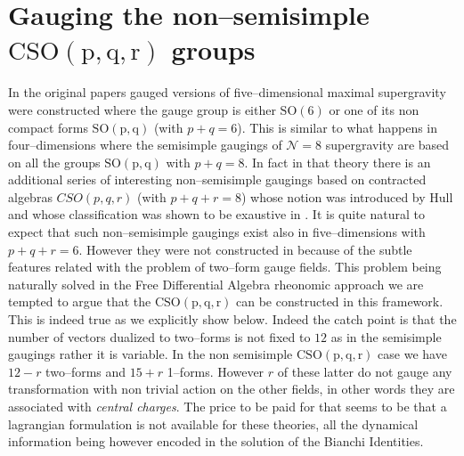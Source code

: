 \documentclass[a4paper,12pt]{article}
\begin{document}
\section{Gauging the non--semisimple $\mathrm{CSO}\mathrm{(p,q,r)}$ groups}
In the original papers \cite{gunwar,PPV} gauged versions of
five--dimensional maximal supergravity were constructed where the
gauge group is either $\mathrm{SO(6)}$ or one of its non compact
forms $\mathrm{SO(p,q)}$ (with $p+q=6$). This is similar to what
happens in four--dimensions where the semisimple gaugings of
$\mathcal{N}=8 $ supergravity are based on all the groups
$\mathrm{SO(p,q)}$ with $p+q=8$. In fact in that theory there is
an additional series of interesting non--semisimple gaugings based
on contracted algebras $CSO(p,q,r)$ (with $p+q+r=8$) whose notion
was introduced by Hull \cite{hull,hull2} and whose classification
was shown to be exaustive in \cite{noi4D}. It is quite natural to
expect that such non--semisimple gaugings exist also in
five--dimensions with $p+q+r=6$. However they were not constructed
in \cite{gunwar,PPV} because of the subtle features related with
the problem of two--form gauge fields. This problem being
naturally solved in the Free Differential Algebra rheonomic
approach we are tempted to argue that the
$\mathrm{CSO}\mathrm{(p,q,r)}$ can be constructed in this
framework. This is indeed true as we explicitly show below. Indeed
the catch point is that the number of vectors dualized to
two--forms is not fixed to $12$ as in the semisimple gaugings
rather it is variable. In the non semisimple
$\mathrm{CSO}\mathrm{(p,q,r)}$ case we have $12-r$ two--forms and
$15+r$ 1--forms. However $r$ of these latter do not gauge any
transformation with non trivial action on the other fields, in
other words they are associated with {\it central charges}. The
price to be paid for that seems to be that a lagrangian
formulation is not available for these theories, all the dynamical
information being however encoded in the solution of the Bianchi
Identities.
\end{document}
